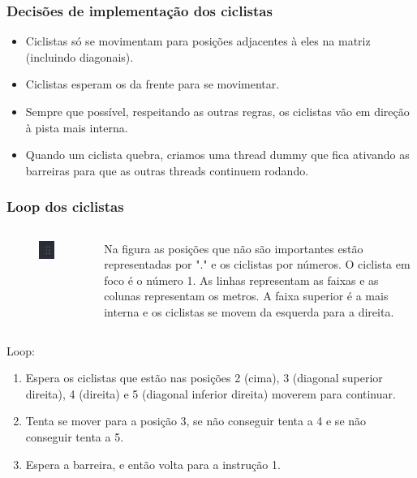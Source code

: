 \documentclass{beamer}
\begin{document}
\begin{frame}
\frametitle{Decisões de implementação dos ciclistas}
\begin{itemize}
\item Ciclistas só se movimentam para posições adjacentes à eles na matriz (incluindo diagonais).
\item Ciclistas esperam os da frente para se movimentar.
\item Sempre que possível, respeitando as outras regras, os ciclistas vão em direção à pista mais interna.
\item Quando um ciclista quebra, criamos uma thread dummy que fica ativando as barreiras para que as outras threads continuem rodando.
\end{itemize}
\end{frame}

\begin{frame}
\frametitle{Loop dos ciclistas}
\begin{columns}[c]
\begin{figure}
\includegraphics[scale=0.6]{biker_example.png}
\end{figure}
Na figura as posições que não são importantes estão representadas por "." e os ciclistas por números. O ciclista em foco é o número 1. As linhas representam as faixas e as colunas representam os metros. A faixa superior é a mais interna e os ciclistas se movem da esquerda para a direita.
\end{columns}
\vfill
Loop:
\begin{enumerate}
\item Espera os ciclistas que estão nas posições 2 (cima), 3 (diagonal superior direita), 4 (direita) e 5 (diagonal inferior direita) moverem para continuar.
\item Tenta se mover para a posição 3, se não conseguir tenta a 4 e se não conseguir tenta a 5.
\item Espera a barreira, e então volta para a instrução 1.
\end{enumerate}
\end{frame}
\end{document}
